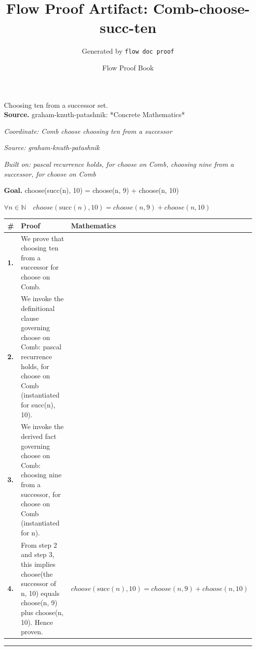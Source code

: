 \documentclass[11pt]{article}
\title{Flow Proof Artifact: Comb-choose-succ-ten}
\author{Generated by \texttt{flow doc proof}}
\date{Flow Proof Book}
\theoremstyle{definition}
\begin{document}
\maketitle
Choosing ten from a successor set.\\[0.5em]
\textbf{Source.} graham-knuth-patashnik: *Concrete Mathematics*\\[0.5em]
\bigskip
{}\par
\smallskip\noindent\textit{Coordinate: Comb \cdot choose \cdot choosing ten from a successor}\par
\smallskip\noindent\textit{Source: graham-knuth-patashnik}\par
\smallskip\noindent\textit{Built on: pascal recurrence holds, for choose on Comb, choosing nine from a successor, for choose on Comb}\par
\medskip
\noindent\textbf{Goal.} choose(succ(n), 10) = choose(n, 9) + choose(n, 10)\par
\noindent$\displaystyle \forall n \in \mathbb{N}\quad choose(\mathrm{succ}(n), 10) = choose(n, 9) + choose(n, 10)$\par
\medskip
\noindent
\begin{tabular}{@{} >{\raggedright\arraybackslash}p{} >{\raggedright\arraybackslash}p{} >{\raggedleft\arraybackslash}p{} @{}}
\textbf{\#} & \textbf{Proof} & \textbf{Mathematics} \\
\midrule
\textbf{1.} & We prove that choosing ten from a successor for choose on Comb. & \\[0.45em]
\textbf{2.} & We invoke the definitional clause governing choose on Comb: pascal recurrence holds, for choose on Comb (instantiated for succ(n), 10). & \\[0.45em]
\textbf{3.} & We invoke the derived fact governing choose on Comb: choosing nine from a successor, for choose on Comb (instantiated for n). & \\[0.45em]
\textbf{4.} & From step 2 and step 3, this implies choose(the successor of n, 10) equals choose(n, 9) plus choose(n, 10). Hence proven. & $\displaystyle choose(\mathrm{succ}(n), 10) = choose(n, 9) + choose(n, 10)$ \\[0.45em]
\bottomrule
\end{tabular}
\label{thm:Comb-choose-choosing_ten_from_a_successor}
\par\medskip\hrule
\end{document}
